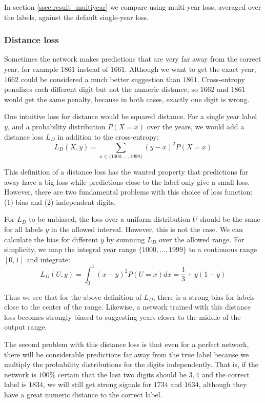In section \ref{ssec:result_multiyear} we compare using multi-year loss, averaged over the labels, against the default single-year loss.

\subsubsection{Distance loss}

Sometimes the network makes predictions that are very far away from the correct year, for example $1861$ instead of $1661$. Although we want to get the exact year, $1662$ could be considered a much better suggestion than $1861$. Cross-entropy penalizes each different digit but not the numeric distance, so $1662$ and $1861$ would get the same penalty, because in both cases, exactly one digit is wrong.

One intuitive loss for distance would be squared distance. For a single year label $y$, and a probability distribution $P(X=x)$ over the years, we would add a distance loss $L_D$ in addition to the cross-entropy:
\[
L_D(X, y) = \sum_{x \in \{1000, \ldots, 1999\}} (y-x)^2 P(X=x)
\]

This definition of a distance loss has the wanted property that predictions far away have a big loss while predictions close to the label only give a small loss. However, there are two fundamental problems with this choice of loss function: (1) bias and (2) independent digits.

For $L_D$ to be unbiased, the loss over a uniform distribution $U$ should be the same for all labels $y$ in the allowed interval. However, this is not the case. We can calculate the bias for different $y$ by summing $L_D$ over the allowed range. For simplicity, we map the integral year range $\{ 1000, \ldots, 1999 \}$ to a continuous range $[0,1]$ and integrate:
\[
L_D(U, y) = \int_0^1 (x-y)^2 P(U=x) dx = \frac{1}{3} + y(1-y)
\]

Thus we see that for the above definition of $L_D$, there is a strong bias for labels close to the center of the range. Likewise, a network trained with this distance loss becomes strongly biased to suggesting years closer to the middle of the output range.

The second problem with this distance loss is that even for a perfect network, there will be considerable predictions far away from the true label because we multiply the probability distributions for the digits independently. That is, if the network is $100\%$ certain that the last two digits should be $3, 4$ and the correct label is $1834$, we will still get strong signals for $1734$ and $1634$, although they have a great numeric distance to the correct label.

